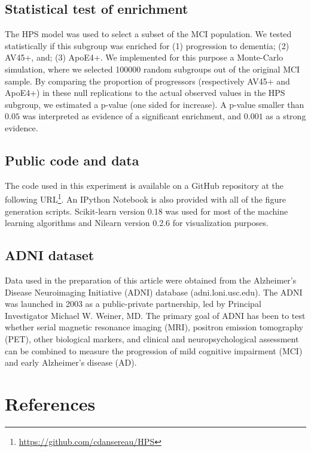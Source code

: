 \documentclass[authoryear]{elsarticle}
\begin{document}
\subsection*{Statistical test of enrichment }
The HPS model was used to select a subset of the MCI population. We tested statistically if this subgroup was enriched for (1) progression to dementia; (2) AV45+, and; (3) ApoE4+. We implemented for this purpose a Monte-Carlo simulation, where we selected 100000 random subgroups out of the original MCI sample. By comparing the proportion of progressors (respectively AV45+ and ApoE4+) in these null replications to the actual observed values in the HPS subgroup, we estimated a p-value \citep{Phipson2010} (one sided for increase). A p-value smaller than $0.05$ was interpreted as evidence of a significant enrichment, and $0.001$ as a strong evidence.
\subsection*{Public code and data}
The code used in this experiment is available on a 
GitHub repository at the following URL\footnote{\url{https://github.com/cdansereau/HPS}}. An IPython Notebook is also provided with all of the figure generation scripts. Scikit-learn \cite{scikit-learn} version 0.18 was used for most of the machine learning algorithms and Nilearn \cite{Abraham2014} version 0.2.6 for visualization purposes.
\subsection*{ADNI dataset}
Data used in the preparation of this article were obtained from the Alzheimer's Disease Neuroimaging Initiative (ADNI) database (adni.loni.usc.edu). The ADNI was launched in 2003 as a public-private partnership, led by Principal Investigator Michael W. Weiner, MD. The primary goal of ADNI has been to test whether serial magnetic resonance imaging (MRI), positron emission tomography (PET), other biological markers, and clinical and neuropsychological assessment can be combined to measure the progression of mild cognitive impairment (MCI) and early Alzheimer's disease (AD).


\section*{References}





\pagebreak
\end{document}
